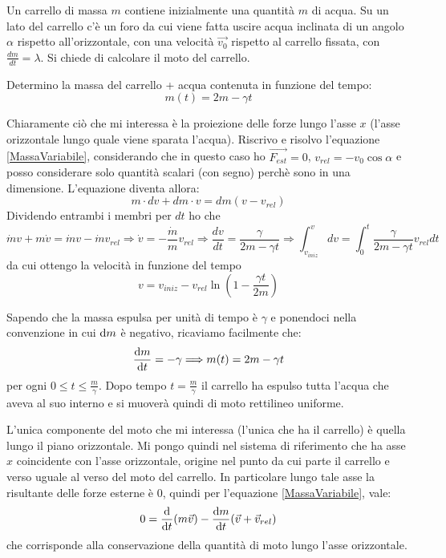 \documentclass[../main.tex]{subfiles}
\begin{document}

\textex
Un carrello di massa $m$ contiene inizialmente una quantità $m$ di acqua.
Su un lato del carrello c'è un foro da cui viene fatta uscire acqua inclinata di un angolo $\alpha$ rispetto all'orizzontale, con una velocità $\overrightarrow {v_0}$ rispetto al carrello fissata, con $\frac{dm}{dt}=\lambda$.
Si chiede di calcolare il moto del carrello.


\solution
Determino la massa del carrello + acqua contenuta in funzione del tempo:
\begin{equation}\label{csa:MassaTempo}
m(t) = 2m-\gamma t
\end{equation}

Chiaramente ciò che mi interessa è la proiezione delle forze lungo l'asse $x$ (l'asse orizzontale lungo quale viene sparata l'acqua). Riscrivo e risolvo l'equazione \cref{MassaVariabile},  considerando che in questo caso ho $\overrightarrow{F_{est}}=0$,  $v_{rel} = -v_0\cos\alpha$ e posso considerare solo quantità scalari (con segno) perchè sono in una dimensione.
L'equazione diventa allora:
\begin{equation}
m\cdot dv + dm \cdot v = dm\left ( v - v_{rel}\right )
\end{equation}
Dividendo entrambi i membri per $dt$ ho che 
\begin{equation}
\dot m v + m\dot v = \dot m v - \dot m v_{rel}\Rightarrow \dot v = - \frac{\dot m}{m}v_{rel} \Rightarrow 
\frac{dv}{dt} = \frac{\gamma}{2m-\gamma t} \Rightarrow \int_{v_{iniz}}^{v} dv = \int_{0}^{t}\frac{\gamma}{2m-\gamma t}v_{rel}dt
\end{equation}
da cui ottengo la velocità in funzione del tempo
\begin{equation}
v = v_{iniz} -v_{rel}\ln \left ( 1-\frac{\gamma t}{2m}\right )
\end{equation}

\solution[2]
Sapendo che la massa espulsa per unità di tempo è $\gamma$ e ponendoci nella convenzione in cui $\mathrm{d} m$ è negativo, ricaviamo facilmente che:
\begin{equation*}
	\frac{\mathrm{d} m}{\mathrm{d} t}=-\gamma \Longrightarrow m(t)=2m-\gamma t
\end{equation*}
per ogni $0\le t \le \frac{m}{\gamma}$. Dopo tempo $t=\frac{m}{\gamma}$ il carrello ha espulso tutta l'acqua che aveva al suo interno e si muoverà quindi di moto rettilineo uniforme.

L'unica componente del moto che mi interessa (l'unica che ha il carrello) è quella lungo il piano orizzontale. Mi pongo quindi nel sistema di riferimento che ha asse $x$ coincidente con l'asse orizzontale, origine nel punto da cui parte il carrello e verso uguale al verso del moto del carrello.
In particolare lungo tale asse la risultante delle forze esterne è 0, quindi per l'equazione \cref{MassaVariabile}, vale:
\begin{equation*}
	0=\frac{\mathrm{d}}{\mathrm{d} t} (m\vec v)-\frac{\mathrm{d} m}{\mathrm{d} t}(\vec v+\vec{v}_{rel})
\end{equation*}
che corrisponde alla conservazione della quantità di moto lungo l'asse orizzontale.
\end{document}
